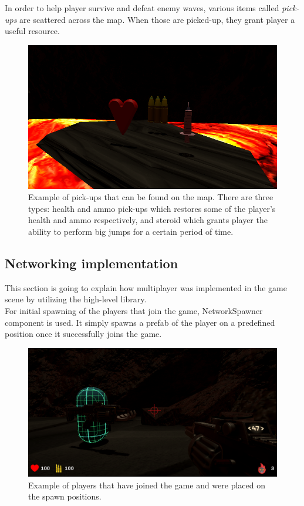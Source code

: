 \documentclass[times, utf8, diplomski]{fer}
\begin{document}
In order to help player survive and defeat enemy waves, various items called \textit{pick-ups} are scattered across the map. When those are picked-up, they grant player a useful resource.

\begin{figure}[H]
	\centering
	\includegraphics[scale=0.7]{Game-pick-ups}
	\caption{Example of pick-ups that can be found on the map. There are three types: health and ammo pick-ups which restores some of the player's health and ammo respectively, and steroid which grants player the ability to perform big jumps for a certain period of time.}
\end{figure}

\subsection{Networking implementation}
This section is going to explain how multiplayer was implemented in the game scene by utilizing the high-level library.\\

For initial spawning of the players that join the game, NetworkSpawner component is used. It simply spawns a prefab of the player on a predefined position once it successfully joins the game.\\

\begin{figure}[H]
	\centering
	\includegraphics[scale=0.5]{Game-players-at-spawn}
	\caption{Example of players that have joined the game and were placed on the spawn positions.}
\end{figure}
\end{document}
